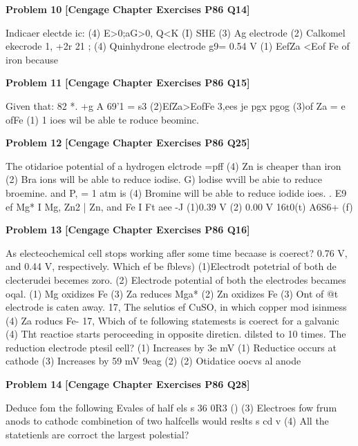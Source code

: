 \begin{problembox}
\textbf{Problem 10} \hfill \textbf{[Cengage Chapter Exercises P86 Q14]}
\label{q:ext-cng-th-10}

Indicaer electde ic:
(4) E>0;aG>0, Q<K
(I) SHE
(3) Ag  electrode
(2) Calkomel ekecrode
1, +2r  21 ;
(4) Quinhydrone electrode
g9= 0.54 V
(1) EefZa <Eof Fe
of iron because
\end{problembox}

\begin{problembox}
\textbf{Problem 11} \hfill \textbf{[Cengage Chapter Exercises P86 Q15]}
\label{q:ext-cng-th-11}

Given that:
82 *. +g
A 69'1 = s3
(2)EfZa>EofFe
  3,ees je pgx pgog
(3)of Za = e ofFe
(1) 1  ioes wil be able te roduce beominc.
\end{problembox}

\begin{problembox}
\textbf{Problem 12} \hfill \textbf{[Cengage Chapter Exercises P86 Q25]}
\label{q:ext-cng-th-12}

The otidarioe potential of a hydrogen elctrode =pff
(4) Zn is cheaper than iron
(2) Bra ions will be able to reduce iodise.
G) lodise wvill be abie to reduce broemine.
and P, = 1 atm is
(4) Bromine will be able to reduce iodide ioes.
. E9 ef Mg* I Mg, Zn2 | Zn, and Fe I Ft aee -J
(1)0.39 V (2) 0.00 V
16t0(t) A6S6+ (f)
\end{problembox}

\begin{problembox}
\textbf{Problem 13} \hfill \textbf{[Cengage Chapter Exercises P86 Q16]}
\label{q:ext-cng-th-13}

As electeochemical cell stops working afler some time
becaase
is coerect?
0.76 V, and 0.44 V, respectively. Which ef be fblevs)
(1)Electrodt potetrial of both de clecterudei becemes zoro.
(2) Electrode potential of both the electrodes becames oqal.
(1) Mg oxidizes Fe
(3) Za reduces Mga*
(2) Zn oxidizes Fe
(3) Ont of @t electrode is caten away.
17, The selutios ef CuSO, in which copper mod isinmess
(4) Za roducs Fe-
17, Wbich of te following statemests is coerect for a galvanic
(4) Tht reactioe starts peroceeding in opposite direticn.
dilsted to 10 times. The reduction electrode ptesil
eell?
(1) Increases by 3e mV
(1) Reductice occurs at cathode
(3) Increases by 59 mV
  9eag (2)
(2) Otidatice oocvs al anode
\end{problembox}

\begin{problembox}
\textbf{Problem 14} \hfill \textbf{[Cengage Chapter Exercises P86 Q28]}
\label{q:ext-cng-th-14}

Deduce fom the following Evales of half els s
36  0R3 ()
(3) Electroes fow frum anods to cathodc
combinetion of two halfcells would reslts s  cd v
(4) All the statetienls are corroct
the largest polestial?
\end{problembox}

